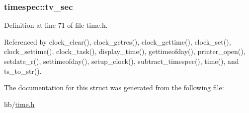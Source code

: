 \hypertarget{structtimespec_afc3302668d7cb5952f590da69fdd4955}{
\subsubsection[{tv\-\_\-sec}]{ timespec\-::tv\-\_\-sec}}\label{structtimespec_afc3302668d7cb5952f590da69fdd4955}


Definition at line 71 of file time.\-h.



Referenced by clock\-\_\-clear(), clock\-\_\-getres(), clock\-\_\-gettime(), clock\-\_\-set(), clock\-\_\-settime(), clock\-\_\-task(), display\-\_\-time(), gettimeofday(), printer\-\_\-open(), setdate\-\_\-r(), settimeofday(), setup\-\_\-clock(), subtract\-\_\-timespec(), time(), and ts\-\_\-to\-\_\-str().



The documentation for this struct was generated from the following file\-:\begin{DoxyCompactItemize}
\item 
lib/\hyperlink{time_8h}{time.\-h}\end{DoxyCompactItemize}
